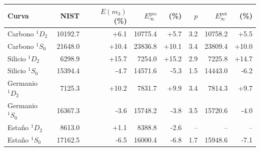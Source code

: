 \begin{tabular}{lrrrrrrr}
    \toprule
    Curva & NIST & $E(m_3)$ (\%) & $E_\infty^{\text{geo}}$ & (\%) & $p$ & $E_\infty^{\text{pot}}$ & (\%) \\
    \midrule
    Carbono $^1D_2$ & 10192.7 & +6.1 & 10775.4 & +5.7 & 3.2 & 10758.2 & +5.5 \\
    Carbono $^1S_0$ & 21648.0 & +10.4 & 23836.8 & +10.1 & 3.4 & 23809.4 & +10.0 \\
    Silicio $^1D_2$ & 6298.9 & +15.7 & 7254.0 & +15.2 & 2.9 & 7225.8 & +14.7 \\
    Silicio $^1S_0$ & 15394.4 & -4.7 & 14571.6 & -5.3 & 1.5 & 14443.0 & -6.2 \\
    Germanio $^1D_2$ & 7125.3 & +10.2 & 7831.7 & +9.9 & 3.4 & 7814.3 & +9.7 \\
    Germanio $^1S_0$ & 16367.3 & -3.6 & 15748.2 & -3.8 & 3.5 & 15720.6 & -4.0 \\
    Estaño $^1D_2$ & 8613.0 & +1.1 & 8388.8 & -2.6 & -- & -- & -- \\
    Estaño $^1S_0$ & 17162.5 & -6.5 & 16000.4 & -6.8 & 1.7 & 15948.6 & -7.1 \\
    \bottomrule
\end{tabular}
